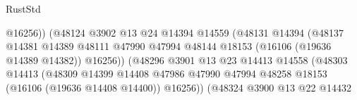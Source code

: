 \begin{lexlean}{RustStd}
\begin{coremodule}
                                                      @16256))
                                                  (@48124
                                                    @3902
                                                    @13
                                                    @24
                                                    @14394
                                                    @14559
                                                    (@48131
                                                      @14394
                                                      (@48137
                                                        @14381
                                                        @14389
                                                        @48111
                                                        @47990
                                                        @47994
                                                        @48144
                                                        @18153
                                                        (@16106 (@19636 @14389 @14382))
                                                        @16256))
                                                    (@48296
                                                      @3901
                                                      @13
                                                      @23
                                                      @14413
                                                      @14558
                                                      (@48303
                                                        @14413
                                                        (@48309
                                                          @14399
                                                          @14408
                                                          @47986
                                                          @47990
                                                          @47994
                                                          @48258
                                                          @18153
                                                          (@16106 (@19636 @14408 @14400))
                                                          @16256))
                                                      (@48324
                                                        @3900
                                                        @13
                                                        @22
                                                        @14432

\end{coremodule}
\end{lexlean}
